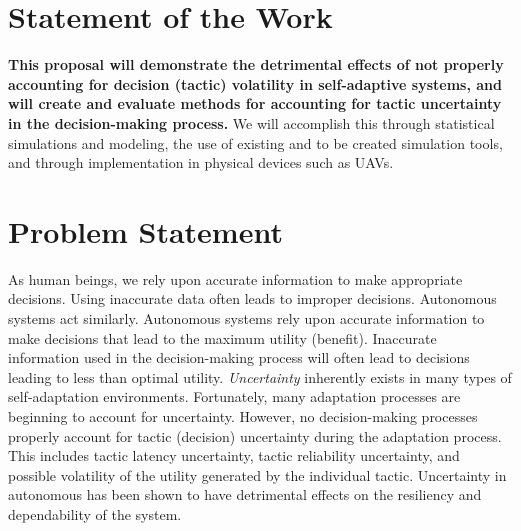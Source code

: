 \documentclass{article}
\newcommand{\todo}[1]{\textcolor{cyan}{\textbf{[#1]}}}
\begin{document}


\section{Statement of the Work}

\textbf{This proposal will demonstrate the detrimental effects of not properly accounting for decision (tactic) volatility in self-adaptive systems, and will create and evaluate methods for accounting for tactic uncertainty in the decision-making process.} We will accomplish this through statistical simulations and modeling, the use of existing and to be created simulation tools, and through implementation in physical devices such as UAVs.



\section{Problem Statement}
As human beings, we rely upon accurate information to make appropriate decisions. Using inaccurate data often leads to improper decisions. Autonomous systems act similarly. Autonomous systems rely upon accurate information to make decisions that lead to the maximum utility (benefit). Inaccurate information used in the decision-making process will often lead to decisions leading  to less than optimal utility. \emph{Uncertainty} inherently exists in many types of self-adaptation environments. Fortunately, many adaptation processes are beginning to account for uncertainty. However, no decision-making processes properly account for tactic (decision) uncertainty during the adaptation process. This includes tactic latency uncertainty, tactic reliability uncertainty, and possible volatility of the utility generated by the individual tactic. Uncertainty in autonomous has been shown to have detrimental effects on the resiliency and dependability of the system.%
\end{document}
